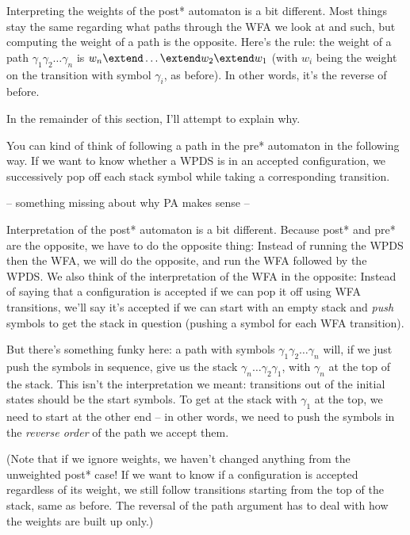 \documentclass{article}
\begin{document}
\begin{defintion}
Interpreting the weights of the post* automaton is a bit
different. Most things stay the same regarding what paths through the
WFA we look at and such, but computing the weight of a path is the
opposite. Here's the rule: the weight of a path $\gamma_1 \gamma_2
\dots \gamma_n$ is $w_n \extend \dots \extend w_2 \extend w_1$ (with
$w_i$ being the weight on the transition with symbol $\gamma_i$, as
before). In other words, it's the reverse of before\footnotemark.


In the remainder of this section, I'll attempt to explain why.

You can kind of think of following a path in the pre* automaton in the
following way. If we want to know whether a WPDS is in an accepted
configuration, we successively pop off each stack symbol while taking
a corresponding transition.

-- something missing about why PA makes sense --

Interpretation of the post* automaton is a bit different. Because
post* and pre* are the opposite, we have to do the opposite thing:
Instead of running the WPDS then the WFA, we will do the opposite, and
run the WFA followed by the WPDS. We also think of the interpretation
of the WFA in the opposite: Instead of saying that a configuration is
accepted if we can pop it off using WFA transitions, we'll say it's
accepted if we can start with an empty stack and \emph{push} symbols
to get the stack in question (pushing a symbol for each WFA
transition).

But there's something funky here: a path with symbols $\gamma_1
\gamma_2 \dots \gamma_n$ will, if we just push the symbols in
sequence, give us the stack $\gamma_n \dots \gamma_2 \gamma_1$, with
$\gamma_n$ at the top of the stack. This isn't the interpretation we
meant: transitions out of the initial states should be the start
symbols. To get at the stack with $\gamma_1$ at the top, we need to
start at the other end -- in other words, we need to push the symbols
in the \emph{reverse order} of the path we accept them.

(Note that if we ignore weights, we haven't changed anything from the
unweighted post* case! If we want to know if a configuration is
accepted regardless of its weight\footnotemark, we still follow
transitions starting from the top of the stack, same as before. The
reversal of the path argument has to deal with how the weights are
built up only.)


\end{defintion}
\end{document}
